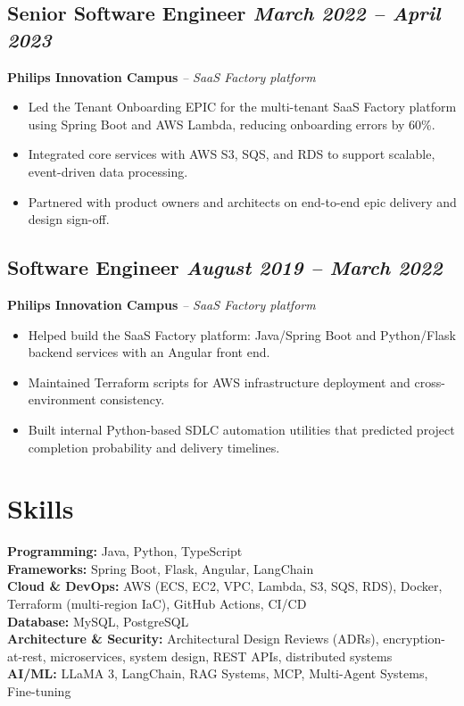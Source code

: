 \documentclass[11pt,a4paper]{article}
\begin{document}
\subsection{Senior Software Engineer \hfill \textit{March 2022 -- April 2023}}
\textbf{Philips Innovation Campus} \quad \textit{-- SaaS Factory platform}
\begin{itemize}
    \item Led the Tenant Onboarding EPIC for the multi-tenant SaaS Factory platform using Spring Boot and AWS Lambda, reducing onboarding errors by 60\%.
    \item Integrated core services with AWS S3, SQS, and RDS to support scalable, event-driven data processing.
    \item Partnered with product owners and architects on end-to-end epic delivery and design sign-off.
\end{itemize}

\subsection{Software Engineer \hfill \textit{August 2019 -- March 2022}}
\textbf{Philips Innovation Campus} \quad \textit{-- SaaS Factory platform}
\begin{itemize}
    \item Helped build the SaaS Factory platform: Java/Spring Boot and Python/Flask backend services with an Angular front end.
    \item Maintained Terraform scripts for AWS infrastructure deployment and cross-environment consistency.
    \item Built internal Python-based SDLC automation utilities that predicted project completion probability and delivery timelines.
\end{itemize}

\section{Skills}
\noindent\textbf{Programming:} Java, Python, TypeScript \\
\textbf{Frameworks:} Spring Boot, Flask, Angular, LangChain \\
\textbf{Cloud \& DevOps:} AWS (ECS, EC2, VPC, Lambda, S3, SQS, RDS), Docker, Terraform (multi-region IaC), GitHub Actions, CI/CD \\
\textbf{Database:} MySQL, PostgreSQL \\
\textbf{Architecture \& Security:} Architectural Design Reviews (ADRs), encryption-at-rest, microservices, system design, REST APIs, distributed systems \\
\textbf{AI/ML:} LLaMA 3, LangChain, RAG Systems, MCP, Multi-Agent Systems, Fine-tuning
\end{document}
